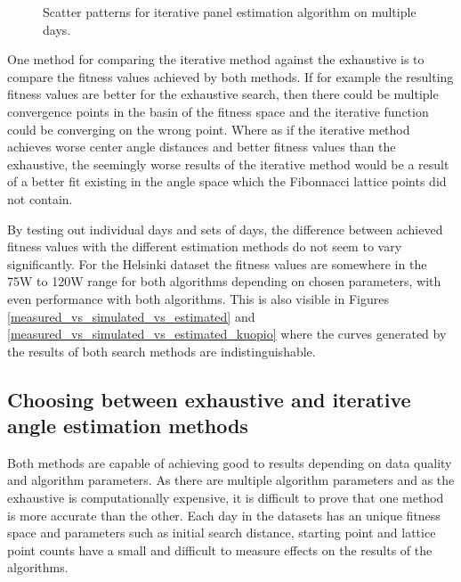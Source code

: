 \begin{figure}[H]
     
\caption{Scatter patterns for iterative panel estimation algorithm on multiple days.}




     \label{fig_iterative_visual_1}
\end{figure}

\noindent One method for comparing the iterative method against the exhaustive is to compare the fitness values achieved by both methods. If for example the resulting fitness values are better for the exhaustive search, then there could be multiple convergence points in the basin of the fitness space and the iterative function could be converging on the wrong point. Where as if the iterative method achieves worse center angle distances and better fitness values than the exhaustive, the seemingly worse results of the iterative method would be a result of a better fit existing in the angle space which the Fibonnacci lattice points did not contain. 

By testing out individual days and sets of days, the difference between achieved fitness values with the different estimation methods do not seem to vary significantly. For the Helsinki dataset the fitness values are somewhere in the 75W to 120W range for both algorithms depending on chosen parameters, with even performance with both algorithms. This is also visible in Figures \ref{measured_vs_simulated_vs_estimated} and \ref{measured_vs_simulated_vs_estimated_kuopio} where the curves generated by the results of both search methods are indistinguishable.



\subsection{Choosing between exhaustive and iterative angle estimation methods}
Both methods are capable of achieving good to results depending on data quality and algorithm parameters. As there are multiple algorithm parameters and as the exhaustive is computationally expensive, it is difficult to prove that one method is more accurate than the other. Each day in the datasets has an unique fitness space and parameters such as initial search distance, starting point and lattice point counts have a small and difficult to measure effects on the results of the algorithms.

